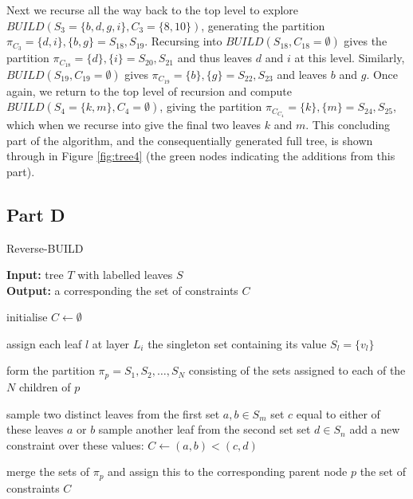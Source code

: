 \documentclass[a4paper, 11pt]{article}
\begin{document}
	Next we recurse all the way back to the top level to explore $BUILD(S_{3} = \{b, d, g, i\}, C_{3} = \{8, 10\})$, generating the partition $\pi_{C_{3}} = \{d, i\}, \{b, g\} = S_{18}, S_{19}$. Recursing into $BUILD(S_{18}, C_{18} = \emptyset)$ gives the partition $\pi_{C_{18}} = \{d\}, \{i\} = S_{20}, S_{21}$ and thus leaves $d$ and $i$ at this level. Similarly, $BUILD(S_{19}, C_{19} = \emptyset)$ gives $\pi_{C_{19}} = \{b\}, \{g\} = S_{22}, S_{23}$ and leaves $b$ and $g$. Once again, we return to the top level of recursion and compute $BUILD(S_{4} = \{k, m\}, C_{4} = \emptyset)$, giving the partition $\pi_{C_{C_{4}}} = \{k\}, \{m\} = S_{24}, S_{25}$, which when we recurse into give the final two leaves $k$ and $m$. This concluding part of the algorithm, and the consequentially generated full tree, is shown through in Figure \ref{fig:tree4} (the green nodes indicating the additions from this part).
	
	\subsection{Part D}
	\label{section:2D}
	
	\begin{algorithm}
		\caption{Reverse-BUILD}
		\label{alg:reverse}
		\textbf{Input:} tree $T$ with labelled leaves $S$ \\
		\textbf{Output:} a corresponding the set of constraints $C$
		
		\begin{algorithmic}[1]
			\STATE initialise $C \leftarrow \emptyset$
			
				
				\STATE assign each leaf $l$ at layer $L_{i}$ the singleton set containing its value $S_{l} = \{v_{l}\}$
				
					
					\STATE form the partition $\pi_{p} = S_{1}, S_{2}, \ldots, S_{N}$ consisting of the sets assigned to each of the $N$ children of $p$
					
						
							
								\STATE sample two distinct leaves from the first set $a, b \in S_{m}$
								\STATE set $c$ equal to either of these leaves $a$ or $b$
								\STATE sample another leaf from the second set set $d \in S_{n}$
								\STATE add a new constraint over these values: $C \leftarrow (a, b) < (c, d)$
							\ENDIF
							
						\ENDFOR
						
						\STATE merge the sets of $\pi_{p}$ and assign this to the corresponding parent node $p$
					\ENDFOR
				\ENDFOR
			\ENDFOR
			\RETURN the set of constraints $C$
	\end{algorithmic}
	\end{algorithm}
	
\end{document}
